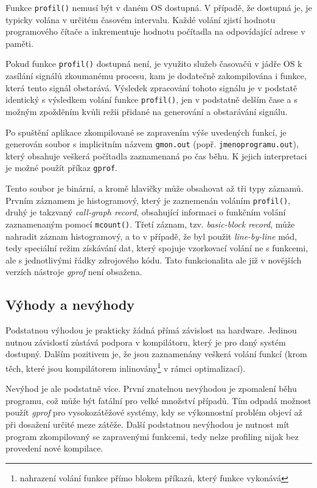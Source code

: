\documentclass[czech,BP]{thesiskiv}
\begin{document}
Funkce \texttt{profil()} nemusí být v daném OS dostupná. V případě, že dostupná je, je typicky volána v určitém časovém intervalu. Každé volání zjistí hodnotu programového čítače a inkrementuje hodnotu počítadla na odpovídající adrese v paměti.

Pokud funkce \texttt{profil()} dostupná není, je využito služeb časovačů v jádře OS k zasílání signálů zkoumanému procesu, kam je dodatečně zakompilována i funkce, která tento signál obstarává. Výsledek zpracování tohoto signálu je v podstatě identický s výsledkem volání funkce \texttt{profil()}, jen v podstatně delším čase a s možným zpožděním kvůli režii přidané na generování a obstarávání signálu.

Po spuštění aplikace zkompilované se zapravením výše uvedených funkcí, je generován soubor s implicitním názvem \texttt{gmon.out} (popř. \texttt{jmenoprogramu.out}), který obsahuje veškerá počítadla zaznamenaná po čas běhu. K jejich interpretaci je možné použít příkaz \texttt{gprof}.

Tento soubor je binární, a kromě hlavičky může obsahovat až tři typy záznamů. Prvním záznamem je histogramový, který je zaznemenán voláním \texttt{profil()}, druhý je takzvaný \emph{call-graph record}, obsahující informaci o funkčním volání zaznamenaným pomocí \texttt{mcount()}. Třetí záznam, tzv. \emph{basic-block record}, může nahradit záznam histogramový, a to v případě, že byl použit \emph{line-by-line} mód, tedy speciální režim získávání dat, který spojuje vzorkovací volání ne s funkcemi, ale s jednotlivými řádky zdrojového kódu. Tato funkcionalita ale již v novějších verzích nástroje \emph{gprof} není obsažena\cite{gprof1}.

\subsection*{Výhody a nevýhody}

Podstatnou výhodou je prakticky žádná přímá závislost na hardware. Jedinou nutnou závislostí zůstává podpora v kompilátoru, který je pro daný systém dostupný. Dalším pozitivem je, že jsou zaznamenány veškerá volání funkcí (krom těch, které jsou kompilátorem inlinovány\footnote{nahrazení volání funkce přímo blokem příkazů, který funkce vykonává} v rámci optimalizací).

Nevýhod je ale podstatně více. První znatelnou nevýhodou je zpomalení běhu programu, což může být fatální pro velké množství případů. Tím odpadá možnost použít \emph{gprof} pro vysokozátěžové systémy, kdy se výkonnostní problém objeví až při dosažení určité meze zátěže. Další podstatnou nevýhodou je nutnost mít program zkompilovaný se zapravenými funkcemi, tedy nelze profiling nijak  bez provedení nové kompilace.
\end{document}
